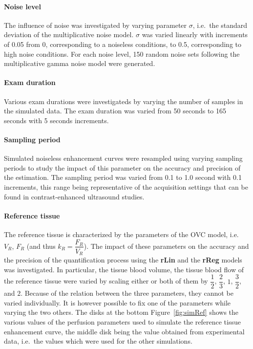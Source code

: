 \paragraph{Noise level}
The influence of noise was investigated by varying parameter $\sigma$, i.e.~the standard deviation of the multiplicative noise model.
$\sigma$ was varied linearly with increments of 0.05 from 0, corresponding to a noiseless conditions, to 0.5, corresponding to high noise conditions.
For each noise level, 150 random noise sets following the multiplicative gamma noise model were generated.

\paragraph{Exam duration}
Various exam durations were investigateds by varying the number of samples in the simulated data.
The exam duration was varied from 50 seconds to 165 seconds with 5 seconds increments.

\paragraph{Sampling period}
Simulated noiseless enhancement curves were resampled using varying sampling periods to study the impact of this parameter on the accuracy and precision of the estimation.
The sampling period was varied from 0.1 to 1.0 second with 0.1 increments, this range being representative of the acquisition settings that can be found in contrast-enhanced ultrasound studies.

\paragraph{Reference tissue}
The reference tissue is characterized by the parameters of the OVC model, i.e.~$V_R$, $F_R$ (and thus $k_R = \dfrac{F_R}{V_R}$).
The impact of these parameters on the accuracy and the precision of the quantification process using the \textbf{rLin} and the \textbf{rReg} models was investigated.
In particular, the tissue blood volume, the tissue blood flow of the reference tissue were varied by scaling either or both of them by $\dfrac{1}{2}$, $\dfrac{2}{3}$, $1$, $\dfrac{3}{2}$, and $2$.
Because of the relation between the three parameters, they cannot be varied individually.
It is however possible to fix one of the parameters while varying the two others.
The disks at the bottom Figure~\ref{fig:simRef} shows the various values of the perfusion parameters used to simulate the reference tissue enhancement curve, the middle disk being the value obtained from experimental data, i.e.~the values which were used for the other simulations.


